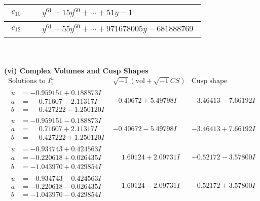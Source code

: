 \documentclass[1p]{elsarticle_modified}
\theoremstyle{definition}
\newcommand{\I}{\sqrt{-1}}
\begin{document}
\begin{tabular}{m{50pt}|m{274pt}}
\hline $$\begin{aligned}c_{10}\end{aligned}$$&$\begin{aligned}
&y^{61}+15 y^{60}+\cdots+51 y-1
\end{aligned}$\\
\hline $$\begin{aligned}c_{12}\end{aligned}$$&$\begin{aligned}
&y^{61}+55 y^{60}+\cdots+971678005 y-681888769
\end{aligned}$\\
\hline
\end{tabular}\\~\\
\newpage\flushleft \textbf{(vi) Complex Volumes and Cusp Shapes}
$$\begin{array}{c|c|c}  
\text{Solutions to }I^u_{1}& \I (\text{vol} + \sqrt{-1}CS) & \text{Cusp shape}\\
 \hline 
\begin{aligned}
u &= -0.959151 + 0.188873 I \\
a &= \phantom{-}0.71607 - 2.11317 I \\
b &= \phantom{-}0.427222 - 1.250120 I\end{aligned}
 & -0.40672 + 5.49798 I & -3.46413 - 7.66192 I \\ \hline\begin{aligned}
u &= -0.959151 - 0.188873 I \\
a &= \phantom{-}0.71607 + 2.11317 I \\
b &= \phantom{-}0.427222 + 1.250120 I\end{aligned}
 & -0.40672 - 5.49798 I & -3.46413 + 7.66192 I \\ \hline\begin{aligned}
u &= -0.934743 + 0.424563 I \\
a &= -0.220618 + 0.026435 I \\
b &= -1.043970 + 0.429854 I\end{aligned}
 & \phantom{-}1.60124 + 2.09731 I & -0.52172 - 3.57800 I \\ \hline\begin{aligned}
u &= -0.934743 - 0.424563 I \\
a &= -0.220618 - 0.026435 I \\
b &= -1.043970 - 0.429854 I\end{aligned}
 & \phantom{-}1.60124 - 2.09731 I & -0.52172 + 3.57800 I \\ \hline\begin{aligned}

\end{aligned}
\end{array}$$
\end{document}
